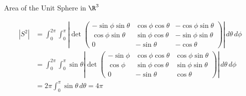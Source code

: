 \documentclass[smaller,hyperref={CJKbookmarks=true}]{beamer}
\begin{document}
\begin{frame}{Area
of the Unit Sphere in $\R^3$}
\begin{spacing}{0.95}
\begin{equation*}
  \begin{split}
     |S^2| &=\int_{0}^{2\pi}\int_{0}^{\pi}\left|\det\begin{pmatrix}
                                                -\sin\phi\sin\theta &\cos\phi\cos\theta &-\cos\phi\sin\theta \\
                                                \cos\phi\sin\theta &\sin\phi\cos\theta &-\sin\phi\sin\theta \\
                                                0 &-\sin\theta & -\cos\theta
                                              \end{pmatrix}\right|\,d\theta\,d\phi \\
       &=\int_{0}^{2\pi}\int_{0}^{\pi}\sin\theta\left|\det\begin{pmatrix}
                                                -\sin\phi &\cos\phi\cos\theta &\cos\phi\sin\theta \\
                                                \cos\phi &\sin\phi\cos\theta &\sin\phi\sin\theta \\
                                                0 &-\sin\theta & \cos\theta
                                              \end{pmatrix}\right|\,d\theta\,d\phi \\
       &=2\pi\int_{0}^{\pi}\sin\theta\,d\theta=4\pi
  \end{split}
\end{equation*}
\end{spacing}
\end{frame}
\end{document}

